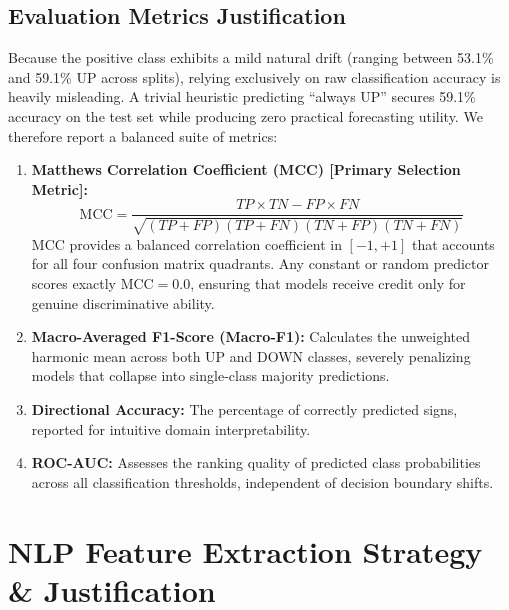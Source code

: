 \documentclass[10pt,a4paper]{article}
\begin{document}
\subsection{Evaluation Metrics Justification}
Because the positive class exhibits a mild natural drift (ranging between 53.1\% and 59.1\% UP across splits), relying exclusively on raw classification accuracy is heavily misleading. A trivial heuristic predicting ``always UP'' secures 59.1\% accuracy on the test set while producing zero practical forecasting utility. We therefore report a balanced suite of metrics:
\begin{enumerate}[leftmargin=1.5em]
    \item \textbf{Matthews Correlation Coefficient (MCC) [Primary Selection Metric]:}
    \begin{equation}
        \text{MCC} = \frac{TP \times TN - FP \times FN}{\sqrt{(TP + FP)(TP + FN)(TN + FP)(TN + FN)}}
    \end{equation}
    MCC provides a balanced correlation coefficient in $[-1, +1]$ that accounts for all four confusion matrix quadrants. Any constant or random predictor scores exactly $\text{MCC} = 0.0$, ensuring that models receive credit only for genuine discriminative ability.
    \item \textbf{Macro-Averaged F1-Score (Macro-F1):} Calculates the unweighted harmonic mean across both UP and DOWN classes, severely penalizing models that collapse into single-class majority predictions.
    \item \textbf{Directional Accuracy:} The percentage of correctly predicted signs, reported for intuitive domain interpretability.
    \item \textbf{ROC-AUC:} Assesses the ranking quality of predicted class probabilities across all classification thresholds, independent of decision boundary shifts.
\end{enumerate}

\section{NLP Feature Extraction Strategy \& Justification}
\end{document}
